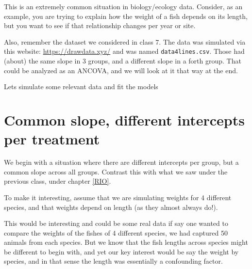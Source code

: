 \documentclass[
]{book}
\begin{document}
This is an extremely common situation in biology/ecology data. Consider, as an example, you are trying to explain how the weight of a fish depends on its length, but you want to see if that relationship changes per year or site.

Also, remember the dataset we considered in class 7. The data was simulated via this website: \url{https://drawdata.xyz/} and was named \texttt{data4lines.csv}. Those had (about) the same slope in 3 groups, and a different slope in a forth group. That could be analyzed as an ANCOVA, and we will look at it that way at the end.

Lets simulate some relevant data and fit the models

\section{Common slope, different intercepts per treatment}\label{common-slope-different-intercepts-per-treatment}

We begin with a situation where there are different intercepts per group, but a common slope across all groups. Contrast this with what we saw under the previous class, under chapter \ref{RIO}.

To make it interesting, assume that we are simulating weights for 4 different species, and that weights depend on length (as they almost always do!).

This would be interesting and could be some real data if say one wanted to compare the weights of the fishes of 4 different species, we had captured 50 animals from each species. But we know that the fish lengths across species might be different to begin with, and yet our key interest would be say the weight by species, and in that sense the length was essentially a confounding factor.
\end{document}
